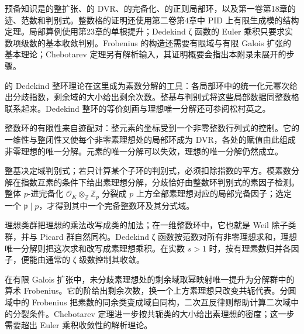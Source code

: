 \ProseParagraphBreak

预备知识是的整扩张、的 DVR、的完备化、的正则局部环，以及第一卷第18章的迹、范数和判别式。整数格的证明还使用第二卷第4章中 PID 上有限生成模的结构定理。局部算例使用第23章的单根提升；Dedekind ζ 函数的 Euler 乘积只要求实数项级数的基本收敛判别。Frobenius 的构造还需要有限域与有限 Galois 扩张的基本理论；Chebotarev 定理另有解析输入，其证明概要会指出本附录未展开的步骤。

\ProseParagraphBreak
{}的 Dedekind 整环理论在这里成为素数分解的工具：各局部环中的统一化元幂次给出分歧指数，剩余域的大小给出剩余次数。整基与判别式将这些局部数据同整数格联系起来。Dedekind 整环的等价刻画与理想唯一分解还可参阅松村英之\cite[Theorem 11.6, pp. 82--84]{Matsumura1989CommutativeRingTheory}。







\begin{chaptersummary}
	整数环的有限性来自迹配对：整元素的坐标受到一个非零整数行列式的控制。它的一维性与整闭性又使每个非零素理想处的局部环成为 DVR，各处的赋值由此组成非零理想的唯一分解。元素的唯一分解可以失效，理想的唯一分解仍然成立。

	\ProseParagraphBreak
	整基决定域判别式；若只计算某个子环的判别式，必须扣除指数的平方。模素数分解在指数互素的条件下给出素理想分解，分歧恰好由整数环判别式的素因子检测。整体 \(p\)-进完备化 \(\mathcal O_K\otimes_{\mathbb Z}\mathbb Z_p\) 分裂成 \(p\) 上方全部素理想对应的局部完备因子；选定一个 \(\mathfrak p\mid p\)，才得到其中一个完备整数环及其分式域。

	\ProseParagraphBreak
	理想类群把理想的乘法改写成类的加法；在一维整数环中，它也就是 Weil 除子类群，并与 Picard 群自然同构。Dedekind ζ 函数按范数对所有非零理想求和，理想唯一分解则把这次求和改写成素理想乘积。在实数 \(s>1\) 时，按有理素数归并各因子，便能由通常的 ζ 级数控制其收敛。

	\ProseParagraphBreak
	在有限 Galois 扩张中，未分歧素理想处的剩余域取幂映射唯一提升为分解群中的算术 Frobenius。它的阶给出剩余次数，换一个上方素理想只改变共轭代表。分圆域中的 Frobenius 把素数的同余类变成域自同构，二次互反律则帮助计算二次域中的分裂条件。Chebotarev 定理进一步按共轭类的大小给出素理想的密度；这一步需要超出 Euler 乘积收敛性的解析理论。
\end{chaptersummary}

